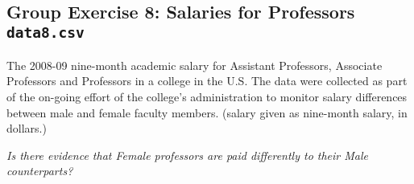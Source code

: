 \documentclass[]{article}
\begin{document}
~

\hypertarget{group-exercise-8-salaries-for-professors-data8.csv}{%
\subsection{\texorpdfstring{Group Exercise 8: Salaries for Professors
\texttt{data8.csv}}{Group Exercise 8: Salaries for Professors data8.csv}}\label{group-exercise-8-salaries-for-professors-data8.csv}}

The 2008-09 nine-month academic salary for Assistant Professors,
Associate Professors and Professors in a college in the U.S. The data
were collected as part of the on-going effort of the college's
administration to monitor salary differences between male and female
faculty members. (salary given as nine-month salary, in dollars.)

{\emph{Is there evidence that Female professors are paid differently to
their Male counterparts?}}
\end{document}
